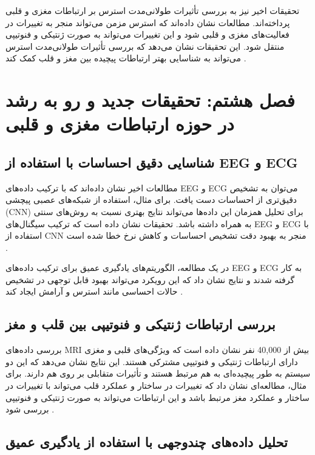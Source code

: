 \documentclass[12pt]{article}
\begin{document}
تحقیقات اخیر نیز به بررسی تأثیرات طولانی‌مدت استرس بر ارتباطات مغزی و قلبی پرداخته‌اند. مطالعات نشان داده‌اند که استرس مزمن می‌تواند منجر به تغییرات در فعالیت‌های مغزی و قلبی شود و این تغییرات می‌تواند به صورت ژنتیکی و فنوتیپی منتقل شود. این تحقیقات نشان می‌دهد که بررسی تأثیرات طولانی‌مدت استرس می‌تواند به شناسایی بهتر ارتباطات پیچیده بین مغز و قلب کمک کند \cite{Wager2009}.

\section{فصل هشتم: تحقیقات جدید و رو به رشد در حوزه ارتباطات مغزی و قلبی}

\subsection{شناسایی دقیق احساسات با استفاده از EEG و ECG}

مطالعات اخیر نشان داده‌اند که با ترکیب داده‌های EEG و ECG می‌توان به تشخیص دقیق‌تری از احساسات دست یافت. برای مثال، استفاده از شبکه‌های عصبی پیچشی (CNN) برای تحلیل همزمان این داده‌ها می‌تواند نتایج بهتری نسبت به روش‌های سنتی به همراه داشته باشد. تحقیقات نشان داده است که ترکیب سیگنال‌های EEG و ECG با استفاده از CNN منجر به بهبود دقت تشخیص احساسات و کاهش نرخ خطا شده است \cite{Bashivan2016}.

در یک مطالعه، الگوریتم‌های یادگیری عمیق برای ترکیب داده‌های EEG و ECG به کار گرفته شدند و نتایج نشان داد که این رویکرد می‌تواند بهبود قابل توجهی در تشخیص حالات احساسی مانند استرس و آرامش ایجاد کند \cite{Kunz2019}.

\subsection{بررسی ارتباطات ژنتیکی و فنوتیپی بین قلب و مغز}

بررسی داده‌های MRI بیش از 40,000 نفر نشان داده است که ویژگی‌های قلبی و مغزی دارای ارتباطات ژنتیکی و فنوتیپی مشترکی هستند. این نتایج نشان می‌دهد که این دو سیستم به طور پیچیده‌ای به هم مرتبط هستند و تأثیرات متقابلی بر روی هم دارند. برای مثال، مطالعه‌ای نشان داد که تغییرات در ساختار و عملکرد قلب می‌تواند با تغییرات در ساختار و عملکرد مغز مرتبط باشد و این ارتباطات می‌تواند به صورت ژنتیکی و فنوتیپی بررسی شود \cite{Zhao2021}.

\subsection{تحلیل داده‌های چندوجهی با استفاده از یادگیری عمیق}
\end{document}
